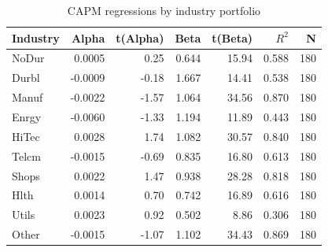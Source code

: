 \begin{table}[!htbp]\centering
\caption{CAPM regressions by industry portfolio}
\begin{tabular}{lrrrrrr}
\hline
Industry & Alpha & t(Alpha) & Beta & t(Beta) & $R^2$ & N \\
\hline
NoDur & 0.0005 & 0.25 & 0.644 & 15.94 & 0.588 & 180 \\
Durbl & -0.0009 & -0.18 & 1.667 & 14.41 & 0.538 & 180 \\
Manuf & -0.0022 & -1.57 & 1.064 & 34.56 & 0.870 & 180 \\
Enrgy & -0.0060 & -1.33 & 1.194 & 11.89 & 0.443 & 180 \\
HiTec & 0.0028 & 1.74 & 1.082 & 30.57 & 0.840 & 180 \\
Telcm & -0.0015 & -0.69 & 0.835 & 16.80 & 0.613 & 180 \\
Shops & 0.0022 & 1.47 & 0.938 & 28.28 & 0.818 & 180 \\
Hlth & 0.0014 & 0.70 & 0.742 & 16.89 & 0.616 & 180 \\
Utils & 0.0023 & 0.92 & 0.502 & 8.86 & 0.306 & 180 \\
Other & -0.0015 & -1.07 & 1.102 & 34.43 & 0.869 & 180 \\
\hline
\end{tabular}
\end{table}
